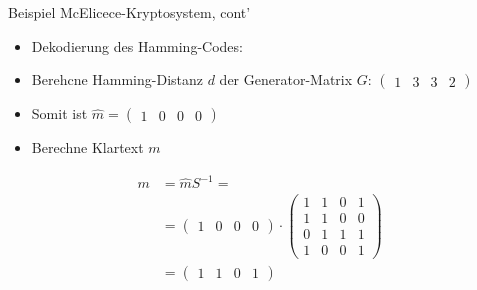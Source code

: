 \documentclass[11pt%
,aspectratio=169%
]{beamer}
\begin{document}
\begin{frame}{Beispiel McElicece-Kryptosystem, cont'}
\begin{itemize}
    \item Dekodierung des Hamming-Codes:
    \item Berehcne Hamming-Distanz $d$ der Generator-Matrix $G$: $\begin{pmatrix} 1 & 3 & 3 & 2 \end{pmatrix}$
    \item Somit ist $\hat{m} = \begin{pmatrix} 1 & 0 & 0 & 0\end{pmatrix}$
    \item Berechne Klartext $m$
\end{itemize}

\begin{align*}
        m &= \hat{m}S^{-1}=\\
        &= \begin{pmatrix} 1 & 0 & 0 & 0 \end{pmatrix} \cdot \begin{pmatrix} 1 & 1 & 0 & 1 \\ 1 & 1 & 0 & 0 \\ 0 & 1 & 1 & 1 \\ 1 & 0 & 0 & 1 \end{pmatrix}\\
        &= \begin{pmatrix} 1 & 1 & 0 & 1 \end{pmatrix}
\end{align*}
\end{frame}
\end{document}

